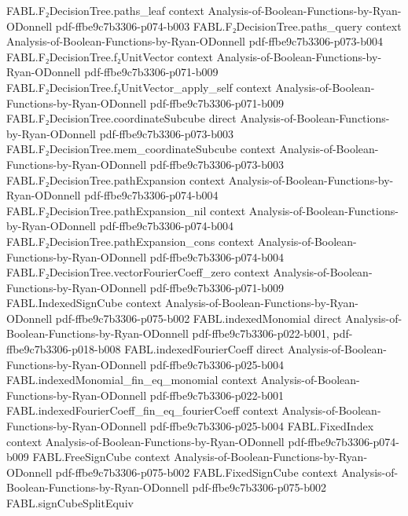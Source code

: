 \begin{theorem}
\proofstep
  {FABL.F₂DecisionTree.paths_leaf}
  {context}
  {Analysis-of-Boolean-Functions-by-Ryan-ODonnell}
  {pdf-ffbe9c7b3306-p074-b003}
\proofstep
  {FABL.F₂DecisionTree.paths_query}
  {context}
  {Analysis-of-Boolean-Functions-by-Ryan-ODonnell}
  {pdf-ffbe9c7b3306-p073-b004}
\proofstep
  {FABL.F₂DecisionTree.f₂UnitVector}
  {context}
  {Analysis-of-Boolean-Functions-by-Ryan-ODonnell}
  {pdf-ffbe9c7b3306-p071-b009}
\proofstep
  {FABL.F₂DecisionTree.f₂UnitVector_apply_self}
  {context}
  {Analysis-of-Boolean-Functions-by-Ryan-ODonnell}
  {pdf-ffbe9c7b3306-p071-b009}
\proofstep
  {FABL.F₂DecisionTree.coordinateSubcube}
  {direct}
  {Analysis-of-Boolean-Functions-by-Ryan-ODonnell}
  {pdf-ffbe9c7b3306-p073-b003}
\proofstep
  {FABL.F₂DecisionTree.mem_coordinateSubcube}
  {context}
  {Analysis-of-Boolean-Functions-by-Ryan-ODonnell}
  {pdf-ffbe9c7b3306-p073-b003}
\proofstep
  {FABL.F₂DecisionTree.pathExpansion}
  {context}
  {Analysis-of-Boolean-Functions-by-Ryan-ODonnell}
  {pdf-ffbe9c7b3306-p074-b004}
\proofstep
  {FABL.F₂DecisionTree.pathExpansion_nil}
  {context}
  {Analysis-of-Boolean-Functions-by-Ryan-ODonnell}
  {pdf-ffbe9c7b3306-p074-b004}
\proofstep
  {FABL.F₂DecisionTree.pathExpansion_cons}
  {context}
  {Analysis-of-Boolean-Functions-by-Ryan-ODonnell}
  {pdf-ffbe9c7b3306-p074-b004}
\proofstep
  {FABL.F₂DecisionTree.vectorFourierCoeff_zero}
  {context}
  {Analysis-of-Boolean-Functions-by-Ryan-ODonnell}
  {pdf-ffbe9c7b3306-p071-b009}
\proofstep
  {FABL.IndexedSignCube}
  {context}
  {Analysis-of-Boolean-Functions-by-Ryan-ODonnell}
  {pdf-ffbe9c7b3306-p075-b002}
\proofstep
  {FABL.indexedMonomial}
  {direct}
  {Analysis-of-Boolean-Functions-by-Ryan-ODonnell}
  {pdf-ffbe9c7b3306-p022-b001,
    pdf-ffbe9c7b3306-p018-b008}
\proofstep
  {FABL.indexedFourierCoeff}
  {direct}
  {Analysis-of-Boolean-Functions-by-Ryan-ODonnell}
  {pdf-ffbe9c7b3306-p025-b004}
\proofstep
  {FABL.indexedMonomial_fin_eq_monomial}
  {context}
  {Analysis-of-Boolean-Functions-by-Ryan-ODonnell}
  {pdf-ffbe9c7b3306-p022-b001}
\proofstep
  {FABL.indexedFourierCoeff_fin_eq_fourierCoeff}
  {context}
  {Analysis-of-Boolean-Functions-by-Ryan-ODonnell}
  {pdf-ffbe9c7b3306-p025-b004}
\proofstep
  {FABL.FixedIndex}
  {context}
  {Analysis-of-Boolean-Functions-by-Ryan-ODonnell}
  {pdf-ffbe9c7b3306-p074-b009}
\proofstep
  {FABL.FreeSignCube}
  {context}
  {Analysis-of-Boolean-Functions-by-Ryan-ODonnell}
  {pdf-ffbe9c7b3306-p075-b002}
\proofstep
  {FABL.FixedSignCube}
  {context}
  {Analysis-of-Boolean-Functions-by-Ryan-ODonnell}
  {pdf-ffbe9c7b3306-p075-b002}
\proofstep
  {FABL.signCubeSplitEquiv}

\end{theorem}
